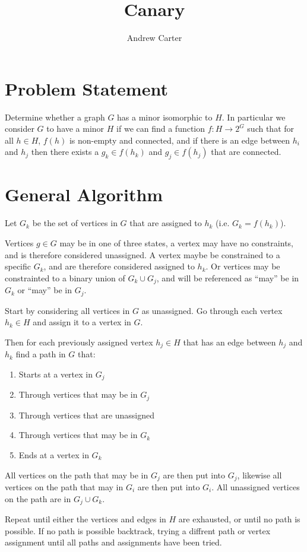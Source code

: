 \documentclass[11pt,twocolumn]{article}
\title{Canary}
\author{Andrew Carter}
\begin{document}
\maketitle

\section{Problem Statement}
Determine whether a graph $G$ has a minor isomorphic to $H$.
In particular we consider $G$ to have a minor $H$ if we can find a function $f : H \to 2^G$
 such that for all $h \in H$, $f(h)$ is non-empty and connected,
  and if there is an edge between $h_i$ and $h_j$
 then there exists a $g_k \in f(h_k)$  and $g_j \in f(h_j)$ that are connected.

\section{General Algorithm}
Let $G_k$ be the set of vertices in $G$ that are assigned to $h_k$ (i.e. $G_k = f(h_k)$).

Vertices $g \in G$ may be in one of three states, a vertex may have no constraints, and is therefore considered unassigned.
A vertex maybe be constrained to a specific $G_k$, and are therefore considered assigned to $h_k$.
Or vertices may be constrainted to a binary union of $G_k \cup G_j$,
 and will be referenced as ``may'' be in $G_k$ or ``may'' be in $G_j$.

Start by considering all vertices in $G$ as unassigned.
Go through each vertex $h_k \in H$ and assign it to a vertex in $G$.

Then for each previously assigned vertex $h_j \in H$ that has an edge between $h_j$ and $h_k$ find a path in $G$ that:
\begin{enumerate}
\item Starts at a vertex in $G_j$
\item Through vertices that may be in $G_j$
\item Through vertices that are unassigned
\item Through vertices that may be in $G_k$
\item Ends at a vertex in $G_k$
\end{enumerate}
All vertices on the path that may be in $G_j$ are then put into $G_j$,
  likewise all vertices on the path that may in $G_i$ are then put into $G_i$.
All unassigned vertices on the path are in $G_j \cup G_k$.

Repeat until either the vertices and edges in $H$ are exhausted, or until no path is possible.
If no path is possible backtrack, trying a diffrent path or vertex assignment until all paths and assignments have been tried.
\end{document}

